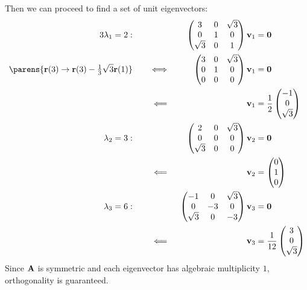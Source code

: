 \documentclass[fleqn,a4paper,11pt]{article}
\begin{document}
\begin{enumerate}[label=\textbf{\arabic*.}]
\begin{enumerate}[label=(\textbf{\Alph*})]
    Then we can proceed to find a set of unit eigenvectors:
    \begin{alignat*}3
     \lambda_1 = 2:\quad&& &&
     \begin{pmatrix}
      3 & 0 & \sqrt 3 \\
      0 & 1 & 0 \\
      \sqrt 3 & 0 & 1
     \end{pmatrix}
     \vec v_1 &= \vec 0 \\
     \parens{
      \vec r(3) \to \vec r(3) - \tfrac 13 \sqrt 3 \vec r(1)
     } \quad
     &&\iff{}&&
     \begin{pmatrix}
      3 & 0 & \sqrt 3 \\
      0 & 1 & 0 \\
      0 & 0 & 0
     \end{pmatrix}
     \vec v_1 &= \vec 0 \\
     &&\impliedby{}&&
     \vec v_1 &= \frac 12\begin{pmatrix} -1 \\ 0 \\ \sqrt 3 \end{pmatrix} \\
     \lambda_2 = 3:\quad&& &&
     \begin{pmatrix}
      2 & 0 & \sqrt 3 \\
      0 & 0 & 0 \\
      \sqrt 3 & 0 & 0
     \end{pmatrix}
     \vec v_2 &= \vec 0 \\
     &&\impliedby{}&&
     \vec v_2 &= \begin{pmatrix} 0 \\ 1 \\ 0 \end{pmatrix} \\
     \lambda_3 = 6:\quad&& &&
     \begin{pmatrix}
      -1 & 0 & \sqrt 3 \\
      0 & -3 & 0 \\
      \sqrt 3 & 0 & -3
     \end{pmatrix}
     \vec v_3 &= \vec 0 \\
     &&\impliedby{}&&
     \vec v_3 &= \frac 1{12} \begin{pmatrix} 3 \\ 0 \\ \sqrt 3 \end{pmatrix}
    \end{alignat*}
    Since \(\mathbf{A}\) is symmetric and each eigenvector has algebraic
    multiplicity \(1\), orthogonality is guaranteed.


\end{enumerate}
\end{enumerate}
\end{document}
